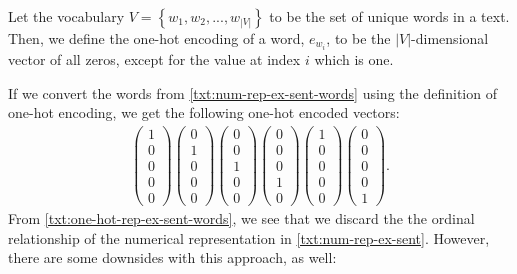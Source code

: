 Let the vocabulary $V = \left \{ w_1, w_2, ..., w_{|V|} \right \}$ to be the set of unique words in a text. Then, we define the one-hot encoding of a word, $e_{w_i}$, to be the $|V|$-dimensional vector of all zeros, except for the value at index $i$ which is one.

If we convert the words from \cref{txt:num-rep-ex-sent-words} using the definition of one-hot encoding, we get the following one-hot encoded vectors:
\begin{align}
    \begin{pmatrix}
    1\\
    0\\
    0\\
    0\\
    0
    \end{pmatrix}
    \begin{pmatrix}
    0\\
    1\\
    0\\
    0\\
    0
    \end{pmatrix}
    \begin{pmatrix}
    0\\
    0\\
    1\\
    0\\
    0
    \end{pmatrix}
    \begin{pmatrix}
    0\\
    0\\
    0\\
    1\\
    0
    \end{pmatrix}
    \begin{pmatrix}
    1\\
    0\\
    0\\
    0\\
    0
    \end{pmatrix}
    \begin{pmatrix}
    0\\
    0\\
    0\\
    0\\
    1
    \end{pmatrix}.
    \label{txt:one-hot-rep-ex-sent-words}
\end{align}
From \cref{txt:one-hot-rep-ex-sent-words}, we see that we discard the the ordinal relationship of the numerical representation in \cref{txt:num-rep-ex-sent}. However, there are some downsides with this approach, as well:

